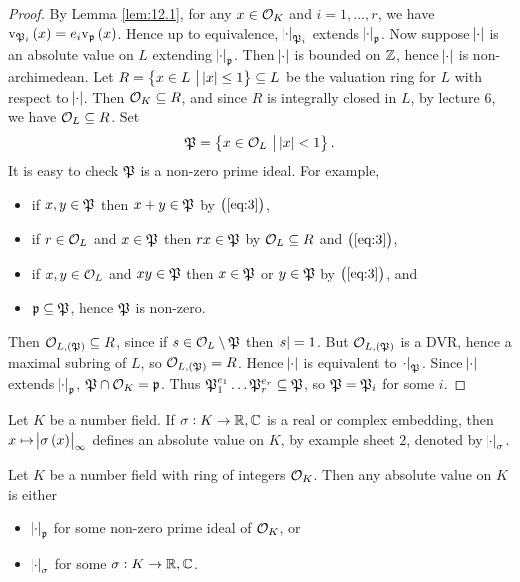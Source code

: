 \begin{proof}
By Lemma \ref{lem:12.1}, for any $ x \in \mathcal{O}_K $ and $ i = 1, \dots, r $, we have $ \v_{\pp_i}\br{x} = e_i\v_\ppp\br{x} $. Hence up to equivalence, $ \abs{\cdot}_{\mathfrak{P}_i} $ extends $ \abs{\cdot}_{\mathfrak{p}} $. Now suppose $ \abs{\cdot} $ is an absolute value on $ L $ extending $ \abs{\cdot}_{\mathfrak{p}} $. Then $ \abs{\cdot} $ is bounded on $ \mathbb{Z} $, hence $ \abs{\cdot} $ is non-archimedean. Let $ R = \cbr{x \in L \st \abs{x} \le 1} \subseteq L $ be the valuation ring for $ L $ with respect to $ \abs{\cdot} $. Then $ \mathcal{O}_K \subseteq R $, and since $ R $ is integrally closed in $ L $, by lecture $ 6 $, we have $ \mathcal{O}_L \subseteq R $. Set
\begin{equation}
\label{eq:3}
\pp = \cbr{x \in \OOO_L \st \abs{x} < 1}.
\end{equation}
It is easy to check $ \mathfrak{P} $ is a non-zero prime ideal. For example,
\begin{itemize}
\item if $ x, y \in \mathfrak{P} $ then $ x + y \in \mathfrak{P} $ by $ \br{\ref{eq:3}} $,
\item if $ r \in \mathcal{O}_L $ and $ x \in \mathfrak{P} $ then $ rx \in \mathfrak{P} $ by $ \mathcal{O}_L \subseteq R $ and $ \br{\ref{eq:3}} $,
\item if $ x, y \in \mathcal{O}_L $ and $ xy \in \mathfrak{P} $ then $ x \in \mathfrak{P} $ or $ y \in \mathfrak{P} $ by $ \br{\ref{eq:3}} $, and
\item $ \mathfrak{p} \subseteq \mathfrak{P} $, hence $ \mathfrak{P} $ is non-zero.
\end{itemize}
Then $ \OOO_{L, \br{\pp}} \subseteq R $, since if $ s \in \mathcal{O}_L \setminus \mathfrak{P} $ then $ \abs{s} = 1 $. But $ \OOO_{L, \br{\pp}} $ is a DVR, hence a maximal subring of $ L $, so $ \OOO_{L, \br{\pp}} = R $. Hence $ \abs{\cdot} $ is equivalent to $ \abs{\cdot}_{\mathfrak{P}} $. Since $ \abs{\cdot} $ extends $ \abs{\cdot}_{\mathfrak{p}} $, $ \mathfrak{P} \cap \mathcal{O}_K = \mathfrak{p} $. Thus $ \mathfrak{P}_1^{e_1} \dots \mathfrak{P}_r^{e_r} \subseteq \mathfrak{P} $, so $ \mathfrak{P} = \mathfrak{P}_i $ for some $ i $.
\end{proof}

Let $ K $ be a number field. If $ \sigma : K \to \mathbb{R}, \mathbb{C} $ is a real or complex embedding, then $ x \mapsto \abs{\sigma\br{x}}_\infty $ defines an absolute value on $ K $, by example sheet $ 2 $, denoted by $ \abs{\cdot}_\sigma $.

\begin{corollary}
Let $ K $ be a number field with ring of integers $ \mathcal{O}_K $. Then any absolute value on $ K $ is either
\begin{itemize}
\item $ \abs{\cdot}_{\mathfrak{p}} $ for some non-zero prime ideal of $ \mathcal{O}_K $, or
\item $ \abs{\cdot}_\sigma $ for some $ \sigma : K \to \mathbb{R}, \mathbb{C} $.
\end{itemize}
\end{corollary}

